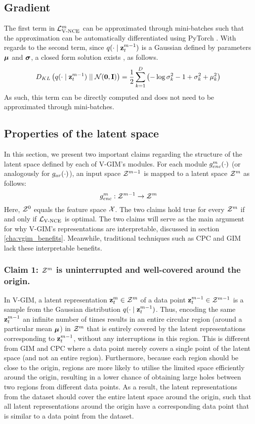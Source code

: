 	\subsection{Gradient}
		The first term in $\mathcal{L}_{\text{V-NCE}}^m$ can be approximated through mini-batches such that the approximation can be automatically differentiated using PyTorch \cite{paszkeAutomaticDifferentiationPyTorch2017}. With regards to the second term, since $q(\cdot \mid \mathbf{z}_t^{m-1})$ is a Gaussian defined by parameters $\bm{\mu}$ and $\bm{\sigma}$, a closed form solution exists \cite{kingmaAutoEncodingVariationalBayes2022}, as follows.
		\begin{equation} %
			\latentspaceconstraintgim = \latentspaceconstraintclosedformNoI
		\end{equation}
		As such, this term can be directly computed and does not need to be approximated through mini-batches.
	
		
	
	\subsection{Properties of the latent space} \label{cha:contin_space}	
	In this section, we present two important claims regarding the structure of the latent space defined by each of V-GIM's modules. For each module $g_{enc}^m(\cdot)$ (or analogously for $g_{ar}(\cdot)$), an input space $\mathcal{Z}^{m-1}$ is mapped to a latent space $\mathcal{Z}^m$ as follows: 
	$$g_{enc}^m: \mathcal{Z}^{m-1} \rightarrow \mathcal{Z}^m$$
	Here, $\mathcal{Z}^0$ equals the feature space $\mathcal{X}$. The two claims hold true for every $\mathcal{Z}^m$ if and only if $\mathcal{L}_{\text{V-NCE}}$ is optimal. The two claims will serve as the main argument for why V-GIM's representations are interpretable, discussed in section \ref{cha:vgim_benefits}. Meanwhile, traditional techniques such as CPC and GIM lack these interpretable benefits.
	
		\subsubsection{Claim 1: $\mathcal{Z}^m$ is uninterrupted and well-covered around the origin.}
			In V-GIM, a latent representation $\mathbf{z}_t^m \in \mathcal{Z}^m$ of a data point $\mathbf{z}_t^{m-1} \in \mathcal{Z}^{m-1}$ is a sample from the Gaussian distribution $q(\cdot \mid \mathbf{z}_t^{m-1})$. Thus, encoding the same $\mathbf{z}_t^{m-1}$ an infinite number of times results in an entire circular region (around a particular mean $\bm{\mu}$) in $\mathcal{Z}^m$ that is entirely covered by the latent representations corresponding to $\mathbf{z}_t^{m-1}$, without any interruptions in this region. This is different from GIM and CPC where a data point merely covers a single point of the latent space (and not an entire region). Furthermore, because each region should be close to the origin, regions are more likely to utilise the limited space efficiently around the origin, resulting in a lower chance of obtaining large holes between two regions from different data points. As a result, the latent representations from the dataset should cover the entire latent space around the origin, such that all latent representations around the origin have a corresponding data point that is similar to a data point from the dataset.
		
